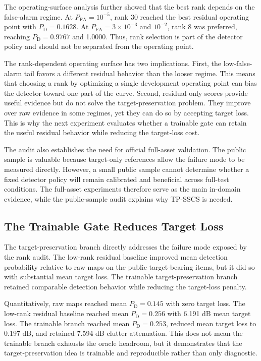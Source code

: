 \documentclass[journal]{IEEEtran}
\begin{document}
The operating-surface analysis further showed that the best rank depends on the false-alarm regime. At $P_{\mathrm{FA}}=10^{-5}$, rank 30 reached the best residual operating point with $P_{\mathrm{D}}=0.1628$. At $P_{\mathrm{FA}}=3 \times 10^{-3}$ and $10^{-2}$, rank 8 was preferred, reaching $P_{\mathrm{D}}=0.9767$ and 1.0000. Thus, rank selection is part of the detector policy and should not be separated from the operating point.

The rank-dependent operating surface has two implications. First, the low-false-alarm tail favors a different residual behavior than the looser regime. This means that choosing a rank by optimizing a single development operating point can bias the detector toward one part of the curve. Second, residual-only scores provide useful evidence but do not solve the target-preservation problem. They improve over raw evidence in some regimes, yet they can do so by accepting target loss. This is why the next experiment evaluates whether a trainable gate can retain the useful residual behavior while reducing the target-loss cost.

The audit also establishes the need for official full-asset validation. The public sample is valuable because target-only references allow the failure mode to be measured directly. However, a small public sample cannot determine whether a fixed detector policy will remain calibrated and beneficial across full-test conditions. The full-asset experiments therefore serve as the main in-domain evidence, while the public-sample audit explains why TP-SSCS is needed.

\subsection{The Trainable Gate Reduces Target Loss}

The target-preservation branch directly addresses the failure mode exposed by the rank audit. The low-rank residual baseline improved mean detection probability relative to raw maps on the public target-bearing items, but it did so with substantial mean target loss. The trainable target-preservation branch retained comparable detection behavior while reducing the target-loss penalty.

Quantitatively, raw maps reached mean $P_{\mathrm{D}}=0.145$ with zero target loss. The low-rank residual baseline reached mean $P_{\mathrm{D}}=0.256$ with 6.191 dB mean target loss. The trainable branch reached mean $P_{\mathrm{D}}=0.253$, reduced mean target loss to 0.197 dB, and retained 7.594 dB clutter attenuation. This does not mean the trainable branch exhausts the oracle headroom, but it demonstrates that the target-preservation idea is trainable and reproducible rather than only diagnostic.
\end{document}
